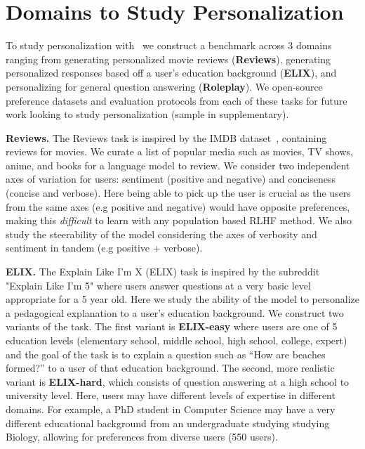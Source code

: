 \section{Domains to Study Personalization}
\label{sec:domains}

To study personalization with \methodname\, we construct a benchmark across 3 domains ranging from generating personalized movie reviews (\textbf{Reviews}), generating personalized responses based off a user's education background (\textbf{ELIX}), and personalizing for general question answering (\textbf{Roleplay}). We open-source preference datasets and evaluation protocols from each of these tasks for future work looking to study personalization (sample in supplementary).

\noindent \textbf{Reviews.} The Reviews task is inspired by the IMDB dataset~\citep{maas-etal-2011-learning}, containing reviews for movies. We curate a list of popular media such as movies, TV shows, anime, and books for a language model to review. We consider two independent axes of variation for users: sentiment (positive and negative) and conciseness (concise and verbose). Here being able to pick up the user is crucial as the users from the same axes (e.g positive and negative) would have opposite preferences, making this \emph{difficult} to learn with any population based RLHF method. We also study the steerability of the model considering the axes of verbosity and sentiment in tandem (e.g positive + verbose). 

\noindent \textbf{ELIX.} The Explain Like I'm X (ELIX) task is inspired by the subreddit "Explain Like I'm 5" where users answer questions at a very basic level appropriate for a 5 year old. Here we study the ability of the model to personalize a pedagogical explanation to a user's education background. We construct two variants of the task. The first variant is \textbf{ELIX-easy} where users are one of 5 education levels (elementary school, middle school, high school, college, expert) and the goal of the task is to explain a question such as ``How are beaches formed?'' to a user of that education background. The second, more realistic variant is \textbf{ELIX-hard}, which consists of question answering at a high school to university level. Here, users may have different levels of expertise in different domains. For example, a PhD student in Computer Science may have a very different educational background from an undergraduate studying studying Biology, allowing for preferences from diverse users (550 users). 

